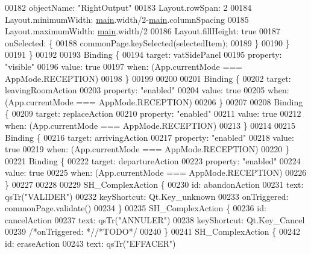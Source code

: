 \begin{DoxyCode}
00182             objectName: \textcolor{stringliteral}{"RightOutput"}
00183             Layout.rowSpan: 2
00184             Layout.minimumWidth: \hyperlink{main_8cpp_a3c04138a5bfe5d72780bb7e82a18e627}{main}.width/2-\hyperlink{main_8cpp_a3c04138a5bfe5d72780bb7e82a18e627}{main}.columnSpacing
00185             Layout.maximumWidth: \hyperlink{main_8cpp_a3c04138a5bfe5d72780bb7e82a18e627}{main}.width/2
00186             Layout.fillHeight: \textcolor{keyword}{true}
00187             onSelected: \{
00188                 commonPage.keySelected(selectedItem);
00189             \}
00190         \}
00191     \}
00192 
00193     Binding \{
00194         target: vatSidePanel
00195         \textcolor{keyword}{property}: \textcolor{stringliteral}{"visible"}
00196         value: \textcolor{keyword}{true}
00197         when: (App.currentMode === AppMode.RECEPTION)
00198     \}
00199 
00200 
00201     Binding \{
00202         target: leavingRoomAction
00203         \textcolor{keyword}{property}: \textcolor{stringliteral}{"enabled"}
00204         value: \textcolor{keyword}{true}
00205         when: (App.currentMode === AppMode.RECEPTION)
00206     \}
00207 
00208     Binding \{
00209         target: replaceAction
00210         \textcolor{keyword}{property}: \textcolor{stringliteral}{"enabled"}
00211         value: \textcolor{keyword}{true}
00212         when: (App.currentMode === AppMode.RECEPTION)
00213     \}
00214 
00215     Binding \{
00216         target: arrivingAction
00217         \textcolor{keyword}{property}: \textcolor{stringliteral}{"enabled"}
00218         value: \textcolor{keyword}{true}
00219         when: (App.currentMode === AppMode.RECEPTION)
00220     \}
00221     Binding \{
00222         target: departureAction
00223         \textcolor{keyword}{property}: \textcolor{stringliteral}{"enabled"}
00224         value: \textcolor{keyword}{true}
00225         when: (App.currentMode === AppMode.RECEPTION)
00226     \}
00227 
00228 
00229     SH\_ComplexAction \{
00230         \textcolor{keywordtype}{id}: abandonAction
00231         text: qsTr(\textcolor{stringliteral}{"VALIDER"})
00232         keyShortcut: Qt.Key\_unknown
00233         onTriggered: commonPage.validate()
00234     \}
00235     SH\_ComplexAction \{
00236         \textcolor{keywordtype}{id}: cancelAction
00237         text: qsTr(\textcolor{stringliteral}{"ANNULER"})
00238         keyShortcut: Qt.Key\_Cancel
00239         \textcolor{comment}{/*onTriggered: */}\textcolor{comment}{/*TODO*/}
00240     \}
00241     SH\_ComplexAction \{
00242         \textcolor{keywordtype}{id}: eraseAction
00243         text: qsTr(\textcolor{stringliteral}{"EFFACER"})

\end{DoxyCode}
